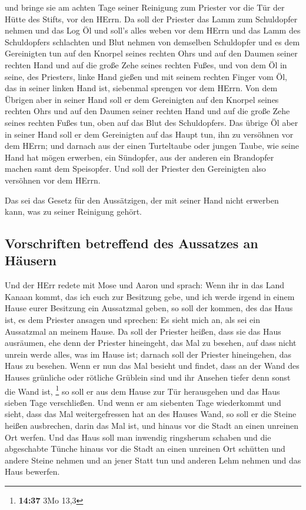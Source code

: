  und bringe sie am achten Tage seiner Reinigung zum
Priester vor die Tür der Hütte des Stifts, vor den HErrn.
 Da soll der Priester das Lamm zum Schuldopfer nehmen und
das Log Öl und soll's alles weben vor dem HErrn  und das
Lamm des Schuldopfers schlachten und Blut nehmen von demselben
Schuldopfer und es dem Gereinigten tun auf den Knorpel seines rechten
Ohrs und auf den Daumen seiner rechten Hand und auf die große Zehe
seines rechten Fußes,  und von dem Öl in seine, des
Priesters, linke Hand gießen  und mit seinem rechten
Finger vom Öl, das in seiner linken Hand ist, siebenmal sprengen vor dem
HErrn.  Von dem Übrigen aber in seiner Hand soll er dem
Gereinigten auf den Knorpel seines rechten Ohrs und auf den Daumen
seiner rechten Hand und auf die große Zehe seines rechten Fußes tun,
oben auf das Blut des Schuldopfers.  Das übrige Öl aber
in seiner Hand soll er dem Gereinigten auf das Haupt tun, ihn zu
versöhnen vor dem HErrn;  und darnach aus der einen
Turteltaube oder jungen Taube, wie seine Hand hat mögen erwerben,
 ein Sündopfer, aus der anderen ein Brandopfer machen
samt dem Speisopfer. Und soll der Priester den Gereinigten also
versöhnen vor dem HErrn.

 Das sei das Gesetz für den Aussätzigen, der mit seiner
Hand nicht erwerben kann, was zu seiner Reinigung gehört.

\hypertarget{vorschriften-betreffend-des-aussatzes-an-huxe4usern}{%
\subsection{Vorschriften betreffend des Aussatzes an
Häusern}\label{vorschriften-betreffend-des-aussatzes-an-huxe4usern}}

 Und der HErr redete mit Mose und Aaron und sprach:
 Wenn ihr in das Land Kanaan kommt, das ich euch zur
Besitzung gebe, und ich werde irgend in einem Hause eurer Besitzung ein
Aussatzmal geben,  so soll der kommen, des das Haus ist,
es dem Priester ansagen und sprechen: Es sieht mich an, als sei ein
Aussatzmal an meinem Hause.  Da soll der Priester heißen,
dass sie das Haus ausräumen, ehe denn der Priester hineingeht, das Mal
zu besehen, auf dass nicht unrein werde alles, was im Hause ist; darnach
soll der Priester hineingehen, das Haus zu besehen.  Wenn
er nun das Mal besieht und findet, dass an der Wand des Hauses grünliche
oder rötliche Grüblein sind und ihr Ansehen tiefer denn sonst die Wand
ist, \footnote{\textbf{14:37} 3Mo 13,3}  so soll er aus
dem Hause zur Tür herausgehen und das Haus sieben Tage verschließen.
 Und wenn er am siebenten Tage wiederkommt und sieht,
dass das Mal weitergefressen hat an des Hauses Wand,  so
soll er die Steine heißen ausbrechen, darin das Mal ist, und hinaus vor
die Stadt an einen unreinen Ort werfen.  Und das Haus
soll man inwendig ringsherum schaben und die abgeschabte Tünche hinaus
vor die Stadt an einen unreinen Ort schütten  und andere
Steine nehmen und an jener Statt tun und anderen Lehm nehmen und das
Haus bewerfen.

